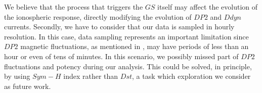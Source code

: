\documentclass[a4paper,fleqn]{cas-dc}
\begin{document}
We believe that the process that triggers the $GS$ itself may affect the evolution of the ionospheric response, directly modifying the evolution of $DP2$ and $Ddyn$ currents. Secondly, we have to consider that our data is sampled in hourly resolution. In this case, data sampling represents an important limitation since $DP2$ magnetic fluctuations, as mentioned in \cite{nishida_68_fluctuations}, may have periods of less than an hour or even of tens of minutes. In this scenario, we possibly missed part of $DP2$ fluctuations and potency during our analysis. This could be solved, in principle, by using $Sym-H$ index rather than $Dst$, a task which exploration we consider as future work.

 




\end{document}
